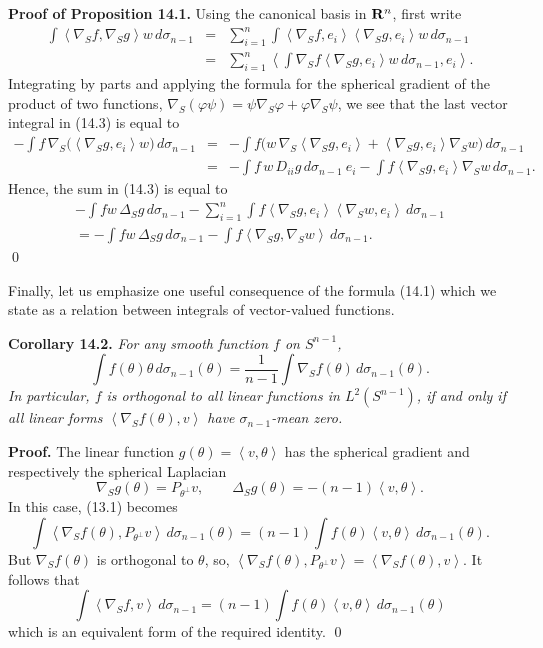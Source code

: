 \documentclass[reqno,12pt]{amsart}
\theoremstyle{plain}
\begin{document}
\vskip5mm
{\bf Proof of Proposition 14.1.}
Using the canonical basis in ${{\bf R}}^n$, first write
\begin{eqnarray}
\int \left<\nabla_S f,\nabla_S g\right> w\,d\sigma_{n-1}
 & = &
\sum_{i=1}^n \int \left<\nabla_S f,e_i\right> 
\left<\nabla_S g,e_i\right> w\,d\sigma_{n-1} \nonumber \\
 & = &
\sum_{i=1}^n \left<\int \nabla_S f
\left<\nabla_S g,e_i\right> w\,d\sigma_{n-1},e_i\right>.
\end{eqnarray}
Integrating by parts and applying the formula for the spherical gradient
of the product of two functions, 
$\nabla_S (\varphi \psi) =  \psi\nabla_S \varphi + \varphi\nabla_S \psi$, 
we see that the last vector integral in (14.3) is equal to
\begin{eqnarray*}
- \int f\, \nabla_S \big(\left<\nabla_S g,e_i\right> w\big)\,d\sigma_{n-1}
 & = &
- \int f \Big(w\,\nabla_S \left<\nabla_S g,e_i\right>
+ \left<\nabla_S g,e_i\right> \nabla_S w\Big)\,d\sigma_{n-1} \\
 & = &
- \int f\, w\, D_{ii} g\,d\sigma_{n-1} \ e_i
- \int f \left<\nabla_S g,e_i\right> \nabla_S w\,d\sigma_{n-1}.
\end{eqnarray*}
Hence, the sum in (14.3) is equal to
\begin{eqnarray*}
- \int f w\, \Delta_S g\,d\sigma_{n-1} - \sum_{i=1}^n 
\int f \left<\nabla_S g,e_i\right> \left<\nabla_S w,e_i\right>\,d\sigma_{n-1} \\
 = - \int fw\, \Delta_S g\,d\sigma_{n-1} -
\int f\left<\nabla_S g,\nabla_S w\right>\,d\sigma_{n-1}.
\end{eqnarray*}
\qed

Finally, let us emphasize one useful consequence of the formula (14.1) which
we state as a relation between integrals of vector-valued functions.

\vskip5mm
{\bf Corollary 14.2.} {\it For any smooth function $f$ on $S^{n-1}$,
$$
\int f(\theta) \theta\,d\sigma_{n-1}(\theta) = 
\frac{1}{n-1} \int \nabla_S f(\theta)\,d\sigma_{n-1}(\theta).
$$
In particular, $f$ is orthogonal to all linear functions in 
$L^2(S^{n-1})$, if and only if all linear forms 
$\left<\nabla_S f(\theta),v\right>$ have $\sigma_{n-1}$-mean zero.
}

\vskip5mm
{\bf Proof.} The linear function  
$g(\theta) = \left<v,\theta\right>$ has the spherical gradient and
respectively the spherical Laplacian
$$
\nabla_S g(\theta) = P_{\theta^\perp} v, \qquad
\Delta_S g(\theta) = - (n-1) \left<v,\theta\right>.
$$
In this case, (13.1) becomes
$$
\int \left<\nabla_S f(\theta),P_{\theta^\perp} v\right>\,
d\sigma_{n-1}(\theta) = 
(n-1) \int f(\theta) \left<v,\theta\right>\,d\sigma_{n-1}(\theta).
$$
But $\nabla_S f(\theta)$ is orthogonal to $\theta$, so, 
$
\left<\nabla_S f(\theta),P_{\theta^\perp} v\right> =
\left<\nabla_S f(\theta),v\right>.
$
It follows that
$$
\int \left<\nabla_S f,v\right>\,d\sigma_{n-1} = 
(n-1) \int f(\theta) \left<v,\theta\right>\,d\sigma_{n-1}(\theta)
$$
which is an equivalent form of the required identity. 
\qed
\end{document}
